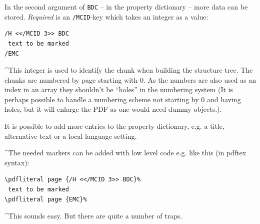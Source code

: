 \documentclass[DIV=12,parskip=half-,bibliography=totoc]{scrartcl}
\newcommand\PDF{PDF}
\begin{document}
\begin{description}
\TagP In the second argument of \texttt{BDC} -- in the property dictionary -- more data can be stored. \emph{Required} is an \texttt{/MCID}-key which takes an integer as a value:\TagPend


\begin{lstlisting}
/H <</MCID 3>> BDC
 text to be marked
/EMC
\end{lstlisting}


\TagP^This integer is used to identify the chunk when building the structure tree. The chunks are numbered by page starting with 0. As the numbers are also used as an index in an array they shouldn't be \enquote{holes} in the numbering system
(It is perhaps possible to handle a numbering scheme not starting by 0 and having holes, but it will enlarge the \PDF{} as one would need dummy objects.).

\TagP It is possible to add more entries to the property dictionary, e.g. a title, alternative text or a local language setting.\Pmeti
\end{description}


\TagP^The needed markers can be added with low level code e.g. like this (in pdftex syntax):\TagPend


\begin{lstlisting}
\pdfliteral page {/H <</MCID 3>> BDC}%
 text to be marked
\pdfliteral page {EMC}%
\end{lstlisting}


\TagP^This sounds easy. But there are quite a number of traps.\TagPend
\end{document}

